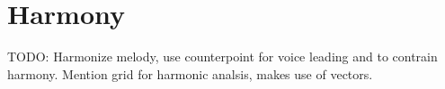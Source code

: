 \section{Harmony}
\label{sec:harmony}

TODO: Harmonize melody, use counterpoint for voice leading and to contrain harmony.
Mention grid for harmonic analsis, makes use of vectors.

